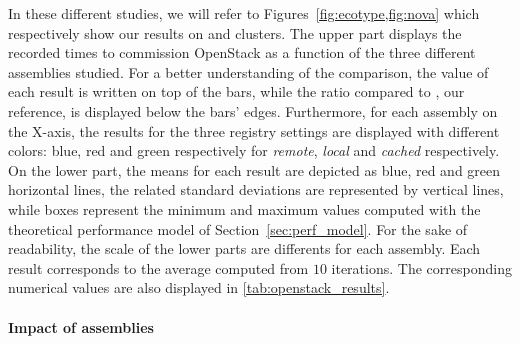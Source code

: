In these different studies, we will refer to
Figures~\ref{fig:ecotype,fig:nova} which respectively show our results
on \ecotype and \nova clusters. The upper part displays the recorded
times to commission OpenStack as a function of the three different
assemblies studied. For a better understanding of the comparison, the
value of each result is written on top of the bars, while the ratio
compared to \ansass, our reference, is displayed below the bars'
edges.  Furthermore, for each assembly on the X-axis, the results for
the three \docker registry settings are displayed with different
colors: blue, red and green respectively for \emph{remote},
\emph{local} and \emph{cached} respectively. On the lower part, the
means for each result are depicted as blue, red and green horizontal
lines, the related standard deviations are represented by vertical
lines, while boxes represent the minimum and maximum values computed
with the theoretical performance model of
Section~\ref{sec:perf_model}.
% 
For the sake of readability, the scale of the lower parts are
differents for each assembly. Each result corresponds to the average
computed from $10$ iterations. The corresponding numerical values are
also displayed in \cref{tab:openstack_results}.
%

\paragraph{Impact of assemblies}

